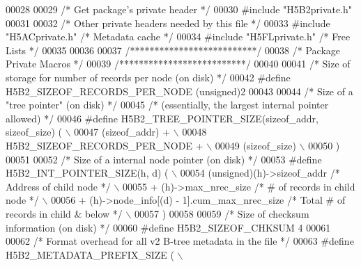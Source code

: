 \begin{DoxyCode}
00028 
00029 \textcolor{comment}{/* Get package's private header */}
00030 \textcolor{preprocessor}{#include "H5B2private.h"}
00031 
00032 \textcolor{comment}{/* Other private headers needed by this file */}
00033 \textcolor{preprocessor}{#include "H5ACprivate.h"}    \textcolor{comment}{/* Metadata cache           */}
00034 \textcolor{preprocessor}{#include "H5FLprivate.h"}    \textcolor{comment}{/* Free Lists                           */}
00035 
00036 
00037 \textcolor{comment}{/**************************/}
00038 \textcolor{comment}{/* Package Private Macros */}
00039 \textcolor{comment}{/**************************/}
00040 
00041 \textcolor{comment}{/* Size of storage for number of records per node (on disk) */}
00042 \textcolor{preprocessor}{#define H5B2\_SIZEOF\_RECORDS\_PER\_NODE    (unsigned)2}
00043 
00044 \textcolor{comment}{/* Size of a "tree pointer" (on disk) */}
00045 \textcolor{comment}{/* (essentially, the largest internal pointer allowed) */}
00046 \textcolor{preprocessor}{#define H5B2\_TREE\_POINTER\_SIZE(sizeof\_addr, sizeof\_size)       (              \(\backslash\)}
00047 \textcolor{preprocessor}{    (sizeof\_addr) +                                                           \(\backslash\)}
00048 \textcolor{preprocessor}{    H5B2\_SIZEOF\_RECORDS\_PER\_NODE +                                            \(\backslash\)}
00049 \textcolor{preprocessor}{    (sizeof\_size)                                                             \(\backslash\)}
00050 \textcolor{preprocessor}{    )}
00051 
00052 \textcolor{comment}{/* Size of a internal node pointer (on disk) */}
00053 \textcolor{preprocessor}{#define H5B2\_INT\_POINTER\_SIZE(h, d) (                                         \(\backslash\)}
00054 \textcolor{preprocessor}{    (unsigned)(h)->sizeof\_addr  }\textcolor{comment}{/* Address of child node */}\textcolor{preprocessor}{                   \(\backslash\)}
00055 \textcolor{preprocessor}{    + (h)->max\_nrec\_size        }\textcolor{comment}{/* # of records in child node */}\textcolor{preprocessor}{              \(\backslash\)}
00056 \textcolor{preprocessor}{    + (h)->node\_info[(d) - 1].cum\_max\_nrec\_size }\textcolor{comment}{/* Total # of records in child & below */}\textcolor{preprocessor}{ \(\backslash\)}
00057 \textcolor{preprocessor}{    )}
00058 
00059 \textcolor{comment}{/* Size of checksum information (on disk) */}
00060 \textcolor{preprocessor}{#define H5B2\_SIZEOF\_CHKSUM      4}
00061 
00062 \textcolor{comment}{/* Format overhead for all v2 B-tree metadata in the file */}
00063 \textcolor{preprocessor}{#define H5B2\_METADATA\_PREFIX\_SIZE (                                           \(\backslash\)}

\end{DoxyCode}
